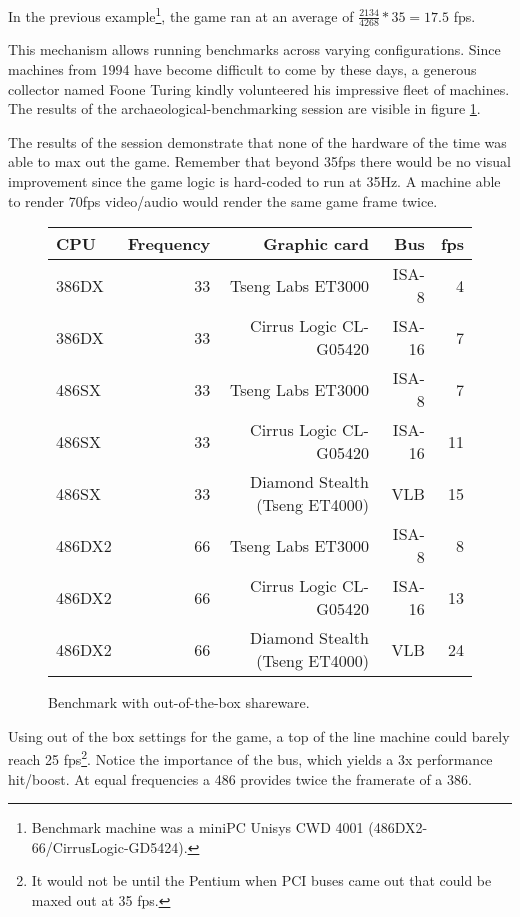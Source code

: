  
In the previous example\footnote{Benchmark machine was a miniPC Unisys CWD 4001 (486DX2-66/CirrusLogic-GD5424).}, the game ran at an average of $\frac{2134}{4268}*35 = 17.5$ fps. \\
\par
This mechanism allows running benchmarks across varying configurations. Since machines from 1994 have become difficult to come by these days, a generous collector named Foone Turing kindly volunteered his impressive fleet of machines. The results of the archaeological-benchmarking session are visible in figure \ref{bnechmarsks}.\\
\par
 The results of the session demonstrate that none of the hardware of the time was able to max out the game. Remember that beyond 35fps there would be no visual improvement since the game logic is hard-coded to run at 35Hz. A machine able to render 70fps video/audio would render the same game frame twice.\\
\par
\begin{figure}[H]
\centering  
\begin{tabularx}{\textwidth}{ L{1}  R{0.3} R{2.4} R{1} R{0.3} }
  \toprule
   \textbf{CPU} & \textbf{Frequency} & \textbf{Graphic card} & \textbf{Bus} & \textbf{fps}\\
  \toprule 
  386DX & 33 & Tseng Labs ET3000    & ISA-8  &  4\\
  386DX\protect\footnotemark & 33 & Cirrus Logic CL-G05420 & ISA-16 &  7\\
  \toprule 
  486SX & 33 & Tseng Labs ET3000                & ISA-8  &  7\\
  486SX & 33 & Cirrus Logic CL-G05420           & ISA-16 & 11\\ 
  486SX & 33 & Diamond Stealth (Tseng ET4000)   & VLB    & 15\\
  \toprule 
  486DX2 & 66 & Tseng Labs ET3000               & ISA-8  &  8\\
  486DX2 & 66 & Cirrus Logic CL-G05420          & ISA-16 & 13\\
  486DX2 & 66 & Diamond Stealth (Tseng ET4000)  & VLB    & 24\\
   \toprule
 \end{tabularx}
\caption{Benchmark with out-of-the-box \doom{} shareware.}
\label{bnechmarsks}
\end{figure}
\par
Using out of the box settings for the game, a top of the line machine could barely reach 25 fps\footnote{It would not be until the Pentium when PCI buses came out that \doom{} could be maxed out at 35 fps.}. Notice the importance of the bus, which yields a 3x performance hit/boost. At equal frequencies a 486 provides twice the framerate of a 386.\\
\par






